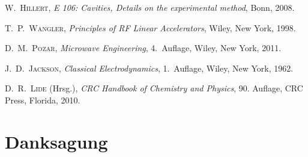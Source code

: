 \documentclass[11pt, a4paper]{scrbook}
\begin{document}
	\begin{thebibliography}{19}
		\textsc{W.\ Hillert},
		\emph{E 106: Cavities, Details on the experimental method}, Bonn, 2008.

		\textsc{T.\ P.\ Wangler},
		\emph{Principles of RF Linear Accelerators},
		Wiley, New York, 1998.
	
		\textsc{D.\ M.\ Pozar},
		\emph{Microwave Engineering}, 4.\ Auflage,
		Wiley, New York, 2011.
	
		\textsc{J.\ D.\ Jackson},
		\emph{Classical Electrodynamics}, 1.\ Auflage,
		Wiley, New York, 1962.
	
		\textsc{D.\ R.\ Lide} (Hrsg.),
		\emph{CRC Handbook of Chemistry and Physics}, 90. Auflage,
		CRC Press, Florida, 2010.
		
	
	\end{thebibliography}
	
	\chapter{Danksagung}
	
	\listoffigures
	\listoftables
	
\end{document}
